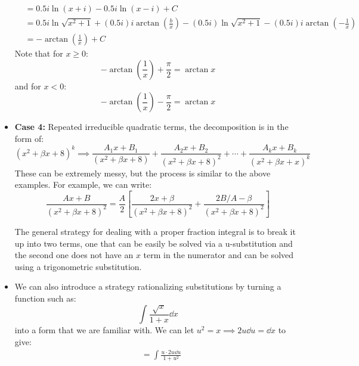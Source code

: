 \begin{itemize}
\begin{example}
\begin{align}
            &= 0.5i\ln(x+i) - 0.5i\ln(x-i) + C \\ 
            &= 0.5i\ln\sqrt{x^2+1} + (0.5i)i\arctan\left(\frac{b}{x}\right) - (0.5i)\ln\sqrt{x^2+1} - (0.5i)i\arctan\left(-\frac{1}{x}\right)\\ 
            &= -\arctan\left(\frac{1}{x}\right) + C
        \end{align}
        Note that for $x \ge 0$:
        \begin{equation}
            -\arctan\left(\frac{1}{x}\right) + \frac{\pi}{2} = \arctan x
        \end{equation}
        and for $x < 0$:
        \begin{equation}
            -\arctan\left(\frac{1}{x}\right) - \frac{\pi}{2} = \arctan x
        \end{equation}
    \end{example}
    \item \textbf{Case 4:} Repeated irreducible quadratic terms, the decomposition is in the form of:
    \begin{equation}
        (x^2+\beta x + 8)^k \implies \frac{A_1x+B_1}{(x^2+\beta x+8)} + \frac{A_2x+B_2}{(x^2+\beta x+8)^2} + \cdots + \frac{A_kx+B_k}{(x^2+\beta x+x)^k}
    \end{equation}
    These can be extremely messy, but the process is similar to the above examples. For example, we can write:
    \begin{equation}
        \frac{Ax+B}{(x^2+\beta x + 8)^2} = \frac{A}{2}\left[\frac{2x+\beta}{(x^2+\beta x + 8)^2} + \frac{2B/A - \beta}{(x^2+\beta x +8)^2}\right]
    \end{equation}
    \begin{idea}
        The general strategy for dealing with a proper fraction integral is to break it up into two terms, one that can be easily be solved via a u-substitution and the second one does not have an $x$ term in the numerator and can be solved using a trigonometric substitution.
    \end{idea}
    \item We can also introduce a strategy rationalizing substitutions by turning a function such as:
    \begin{equation}
        \int \frac{\sqrt{x}}{1+x} \dd{x}
    \end{equation}
    into a form that we are familiar with. We can let $u^2=x \implies 2u \dd{u} = \dd{x}$ to give:
    \begin{align}
        &= \int \frac{u \cdot 2u \dd{u}}{1+u^2} \\ 

\end{align}
\end{itemize}
